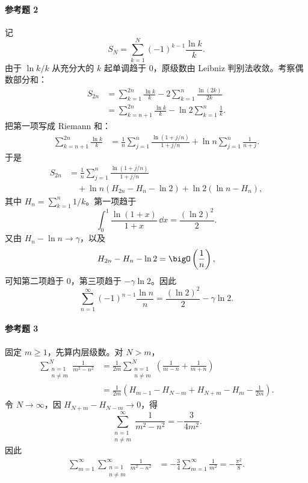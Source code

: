\paragraph{参考题 2}
\begin{xsolution}
记
\[
  S_N=\sum_{k=1}^{N}(-1)^{k-1}\frac{\ln k}{k}.
\]
由于 $\ln k/k$ 从充分大的 $k$ 起单调趋于 $0$，原级数由 Leibniz 判别法收敛。考察偶数部分和：
\[
\begin{aligned}
  S_{2n}
  &=\sum_{k=1}^{2n}\frac{\ln k}{k}
    -2\sum_{k=1}^{n}\frac{\ln(2k)}{2k}\\
  &=\sum_{k=n+1}^{2n}\frac{\ln k}{k}
    -\ln2\sum_{k=1}^{n}\frac1k.
\end{aligned}
\]
把第一项写成 Riemann 和：
\[
\begin{aligned}
  \sum_{k=n+1}^{2n}\frac{\ln k}{k}
  &=\frac1n\sum_{j=1}^{n}
    \frac{\ln(1+j/n)}{1+j/n}
    +\ln n\sum_{j=1}^{n}\frac1{n+j}.
\end{aligned}
\]
于是
\[
\begin{aligned}
  S_{2n}
  &=\frac1n\sum_{j=1}^{n}
    \frac{\ln(1+j/n)}{1+j/n}\\
  &\quad+\ln n\left(H_{2n}-H_n-\ln2\right)
    +\ln2\left(\ln n-H_n\right),
\end{aligned}
\]
其中 $H_n=\sum_{k=1}^n1/k$。第一项趋于
\[
  \int_0^1\frac{\ln(1+x)}{1+x}\,\dd x
  =\frac{(\ln2)^2}{2}.
\]
又由 $H_n-\ln n\to\gamma$，以及
\[
  H_{2n}-H_n-\ln2=\bigO\left(\frac1n\right),
\]
可知第二项趋于 $0$，第三项趋于 $-\gamma\ln2$。因此
\[
  \boxed{\displaystyle
  \sum_{n=1}^{\infty}(-1)^{n-1}\frac{\ln n}{n}
  =\frac{(\ln2)^2}{2}-\gamma\ln2 }.
\]
\end{xsolution}

\paragraph{参考题 3}
\begin{xsolution}
固定 $m\geqslant1$，先算内层级数。对 $N>m$，
\[
\begin{aligned}
\sum_{\substack{n=1\\n\ne m}}^N\frac1{m^2-n^2}
&=\frac1{2m}\sum_{\substack{n=1\\n\ne m}}^N
 \left(\frac1{m-n}+\frac1{m+n}\right)\\
&=\frac1{2m}\left(
H_{m-1}-H_{N-m}+H_{N+m}-H_m-\frac1{2m}
\right).
\end{aligned}
\]
令 $N\to\infty$，因 $H_{N+m}-H_{N-m}\to0$，得
\[
  \sum_{\substack{n=1\\n\ne m}}^{\infty}\frac1{m^2-n^2}
  =-\frac3{4m^2}.
\]
因此
\[
\begin{aligned}
  \sum_{m=1}^{\infty}\sum_{\substack{n=1\\n\ne m}}^{\infty}
  \frac1{m^2-n^2}
  &=-\frac34\sum_{m=1}^{\infty}\frac1{m^2}
  =-\frac{\pi^2}{8}.
\end{aligned}
\]
\end{xsolution}

